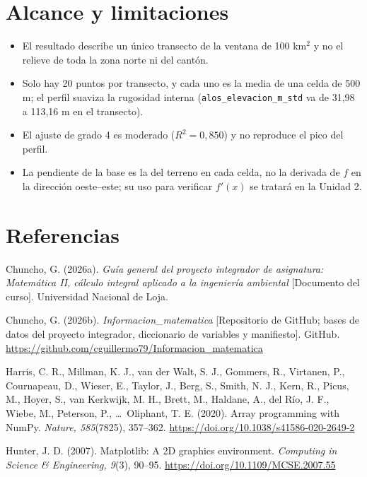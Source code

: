 \documentclass[11pt,a4paper]{article}
\begin{document}
\section{Alcance y limitaciones}
\begin{itemize}
  \item El resultado describe un único transecto de la ventana de 100 km$^2$ y no el relieve de toda la zona norte ni del cantón.
  \item Solo hay 20 puntos por transecto, y cada uno es la media de una celda de 500 m; el perfil suaviza la rugosidad interna (\texttt{alos\_elevacion\_m\_std} va de 31,98 a 113,16 m en el transecto).
  \item El ajuste de grado 4 es moderado ($R^2 = 0{,}850$) y no reproduce el pico del perfil.
  \item La pendiente de la base es la del terreno en cada celda, no la derivada de $f$ en la dirección oeste--este; su uso para verificar $f'(x)$ se tratará en la Unidad 2.
\end{itemize}

\section*{Referencias}
\begingroup
\setlength{\parindent}{-1.27cm}\setlength{\leftskip}{1.27cm}\setlength{\parskip}{6pt}
Chuncho, G. (2026a). \textit{Guía general del proyecto integrador de asignatura: Matemática II, cálculo integral aplicado a la ingeniería ambiental} [Documento del curso]. Universidad Nacional de Loja.

Chuncho, G. (2026b). \textit{Informacion\_matematica} [Repositorio de GitHub; bases de datos del proyecto integrador, diccionario de variables y manifiesto]. GitHub. \url{https://github.com/cguillermo79/Informacion_matematica}

Harris, C. R., Millman, K. J., van der Walt, S. J., Gommers, R., Virtanen, P., Cournapeau, D., Wieser, E., Taylor, J., Berg, S., Smith, N. J., Kern, R., Picus, M., Hoyer, S., van Kerkwijk, M. H., Brett, M., Haldane, A., del Río, J. F., Wiebe, M., Peterson, P., \dots\ Oliphant, T. E. (2020). Array programming with NumPy. \textit{Nature, 585}(7825), 357--362. \url{https://doi.org/10.1038/s41586-020-2649-2}

Hunter, J. D. (2007). Matplotlib: A 2D graphics environment. \textit{Computing in Science \& Engineering, 9}(3), 90--95. \url{https://doi.org/10.1109/MCSE.2007.55}
\end{document}
